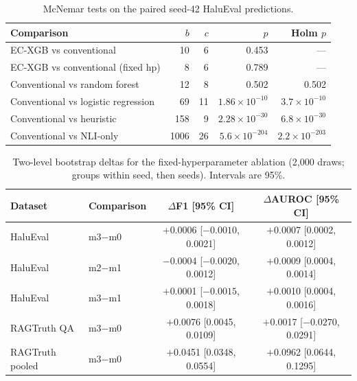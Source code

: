 \documentclass[a4paper,fleqn]{cas-sc}
\begin{document}
\begin{table}[pos=htbp]
  \centering
  \caption{McNemar tests on the paired seed-42 HaluEval predictions.}
  \label{tab:mcnemar}
  \begin{tabular}{lrrrr}
    \toprule
    \textbf{Comparison}                 & \textbf{$b$} & \textbf{$c$} & \textbf{$p$}         & \textbf{Holm $p$}    \\
    \midrule
    EC-XGB vs conventional              & 10           & 6            & 0.453                & ---                  \\
    EC-XGB vs conventional (fixed hp)   & 8            & 6            & 0.789                & ---                  \\
    Conventional vs random forest       & 12           & 8            & 0.502                & 0.502                \\
    Conventional vs logistic regression & 69           & 11           & $1.86\times10^{-10}$ & $3.7\times10^{-10}$  \\
    Conventional vs heuristic           & 158          & 9            & $2.28\times10^{-30}$ & $6.8\times10^{-30}$  \\
    Conventional vs NLI-only            & 1006         & 26           & $5.6\times10^{-204}$ & $2.2\times10^{-203}$ \\
    \bottomrule
  \end{tabular}
\end{table}


\begin{table}[pos=htbp]
  \centering
  \caption{Two-level bootstrap deltas for the fixed-hyperparameter ablation (2{,}000 draws; groups within seed, then seeds). Intervals are 95\%.}
  \label{tab:stats}
  \setlength{\tabcolsep}{4pt}
  \begin{tabular}{llcc}
    \toprule
    \textbf{Dataset} & \textbf{Comparison} & \textbf{$\Delta$F1 [95\% CI]} & \textbf{$\Delta$AUROC [95\% CI]} \\
    \midrule
    HaluEval         & m3$-$m0             & $+$0.0006 [$-0.0010$, 0.0021] & $+$0.0007 [0.0002, 0.0012]       \\
    HaluEval         & m2$-$m1             & $-$0.0004 [$-0.0020$, 0.0012] & $+$0.0009 [0.0004, 0.0014]       \\
    HaluEval         & m3$-$m1             & $+$0.0001 [$-0.0015$, 0.0018] & $+$0.0010 [0.0004, 0.0016]       \\
    RAGTruth QA      & m3$-$m0             & $+$0.0076 [0.0045, 0.0109]    & $+$0.0017 [$-0.0270$, 0.0291]    \\
    RAGTruth pooled  & m3$-$m0             & $+$0.0451 [0.0348, 0.0554]    & $+$0.0962 [0.0644, 0.1295]       \\
    \bottomrule
  \end{tabular}
\end{table}
\end{document}
